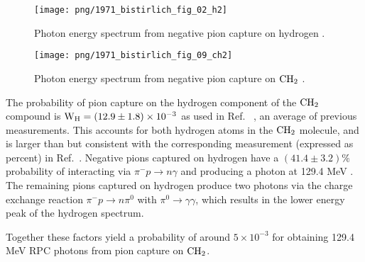 \begin{figure}[H]
 \begin{minipage}{.5\textwidth}
  \texttt{[image: png/1971\_bistirlich\_fig\_02\_h2]}
  \captionsetup{width=.8\linewidth}
  \caption[width=0.9\textwidth]{
      \label{figure:1971_bistirlich_fig_02_h2}
    Photon energy spectrum from negative pion capture on hydrogen \cite{RPC_1972_Bistirlich_PhysRevC.5.1867}.
    }
 \end{minipage}
 \begin{minipage}{.5\textwidth}
  \texttt{[image: png/1971\_bistirlich\_fig\_09\_ch2]}
  \captionsetup{width=.8\linewidth}
  \caption[width=0.9\textwidth]{
  \label{figure:1971_bistirlich_fig_09_ch2}
    Photon energy spectrum from negative pion capture on $\rm{CH_2}$ \cite{RPC_1972_Bistirlich_PhysRevC.5.1867}.
   }
 \end{minipage}
\end{figure}

The probability of pion capture on the hydrogen component of the $\rm{CH_2}$ compound is
$\newline \rm{ W_H = (12.9 \pm 1.8) \times 10^{-3 }}$
 as used in Ref.~\cite{RPC_1991_Harston_PhysRevA.44.103}
 , an average of previous measurements. 
 This accounts for both hydrogen atoms in the $\rm{CH_2}$ molecule, and is larger than but consistent with the
 corresponding measurement (expressed as percent) in Ref.~\cite{RPC_1972_Bistirlich_PhysRevC.5.1867}.
 Negative pions captured on hydrogen have a $ (41.4 \pm 3.2) \% $
 probability of interacting via $\pi^{-} p \to n \gamma$ and producing a photon at 129.4 MeV
 \cite{RPC_1972_Bistirlich_PhysRevC.5.1867}.
 The remaining pions captured on hydrogen produce two photons via the charge exchange reaction
 $ \pi^{-} p \to n \pi^0 $ with $\pi^0  \to \gamma \gamma $,
 which results in the lower energy peak of the hydrogen spectrum. 

Together these factors yield a probability of around $ 5 \times 10^{-3} $
for obtaining 129.4 MeV RPC photons from pion capture on $\rm{CH_2}$.



